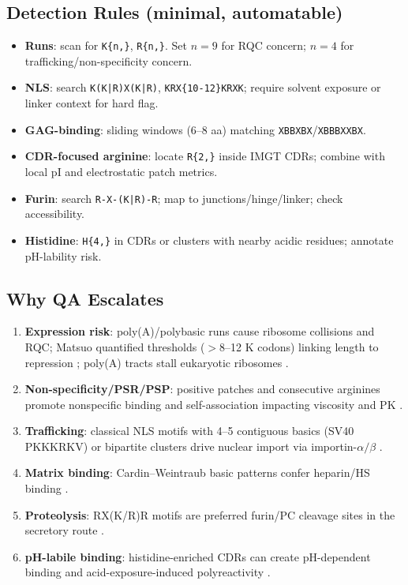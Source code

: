 \subsection*{Detection Rules (minimal, automatable)}
\begin{itemize}\setlength\itemsep{2pt}
\item \textbf{Runs}: scan for \texttt{K\{n,\}}, \texttt{R\{n,\}}. Set $n{=}9$ for RQC concern; $n{=}4$ for trafficking/non-specificity concern.
\item \textbf{NLS}: search \texttt{K(K|R)X(K|R)}, \texttt{KRX\{10-12\}KRXK}; require solvent exposure or linker context for hard flag.
\item \textbf{GAG-binding}: sliding windows (6–8 aa) matching \texttt{XBBXBX}/\texttt{XBBBXXBX}.
\item \textbf{CDR-focused arginine}: locate \texttt{R\{2,\}} inside IMGT CDRs; combine with local pI and electrostatic patch metrics.
\item \textbf{Furin}: search \texttt{R-X-(K|R)-R}; map to junctions/hinge/linker; check accessibility.
\item \textbf{Histidine}: \texttt{H\{4,\}} in CDRs or clusters with nearby acidic residues; annotate pH-lability risk.
\end{itemize}

\subsection*{Why QA Escalates}
\begin{enumerate}\setlength\itemsep{2pt}
\item \textbf{Expression risk}: poly(A)/polybasic runs cause ribosome collisions and RQC; Matsuo quantified thresholds ($>$8–12 K codons) linking length to repression \cite{Matsuo2017}; poly(A) tracts stall eukaryotic ribosomes \cite{Tesina2019,DOrazio2021}.
\item \textbf{Non-specificity/PSR/PSP}: positive patches and consecutive arginines promote nonspecific binding and self-association impacting viscosity and PK \cite{WolfPerez2022,Lecerf2023,Chen2024}.
\item \textbf{Trafficking}: classical NLS motifs with 4–5 contiguous basics (SV40 PKKKRKV) or bipartite clusters drive nuclear import via importin-$\alpha/\beta$ \cite{Hodel2001,NguyenBa2009,Lu2021}.
\item \textbf{Matrix binding}: Cardin–Weintraub basic patterns confer heparin/HS binding \cite{CardinWeintraub,Fromm1997,PLOS2019}.
\item \textbf{Proteolysis}: RX(K/R)R motifs are preferred furin/PC cleavage sites in the secretory route \cite{Garten2018,Lubinski2022,UniProtFurin}.
\item \textbf{pH-labile binding}: histidine-enriched CDRs can create pH-dependent binding and acid-exposure-induced polyreactivity \cite{Klaus2021,Schroter2015,Arakawa2023}.
\end{enumerate}

